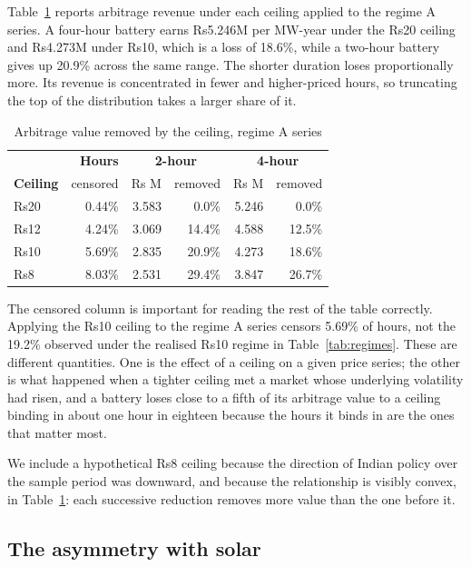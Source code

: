 \documentclass[conference,a4paper]{IEEEtran}
\begin{document}
Table~\ref{tab:removed} reports arbitrage revenue under each ceiling applied to
the regime A series. A four-hour battery earns Rs5.246M per MW-year under the
Rs20 ceiling and Rs4.273M under Rs10, which is a loss of 18.6\%, while a
two-hour battery gives up 20.9\% across the same range. The shorter duration
loses proportionally more. Its revenue is concentrated in fewer and
higher-priced hours, so truncating the top of the distribution takes a larger
share of it.

\begin{table}[htbp]
\caption{Arbitrage value removed by the ceiling, regime A series}
\label{tab:removed}
\centering
\begin{tabular}{lrrrrr}
\hline
& \textbf{Hours} & \multicolumn{2}{c}{\textbf{2-hour}} & \multicolumn{2}{c}{\textbf{4-hour}}\\
\textbf{Ceiling} & censored & Rs M & removed & Rs M & removed\\
\hline
Rs20 & 0.44\% & 3.583 & 0.0\% & 5.246 & 0.0\%\\
Rs12 & 4.24\% & 3.069 & 14.4\% & 4.588 & 12.5\%\\
Rs10 & 5.69\% & 2.835 & 20.9\% & 4.273 & 18.6\%\\
Rs8 & 8.03\% & 2.531 & 29.4\% & 3.847 & 26.7\%\\
\hline
\end{tabular}
\end{table}

The censored column is important for reading the rest of the table correctly.
Applying the Rs10 ceiling to the regime A series censors 5.69\% of hours, not the
19.2\% observed under the realised Rs10 regime in Table~\ref{tab:regimes}. These
are different quantities. One is the effect of a ceiling on a given price
series; the other is what happened when a tighter ceiling met a market whose
underlying volatility had risen, and a battery loses close to a fifth of its
arbitrage value to a ceiling binding in about one hour in eighteen because the
hours it binds in are the ones that matter most.

We include a hypothetical Rs8 ceiling because the direction of Indian policy over
the sample period was downward, and because the relationship is visibly convex,
in Table~\ref{tab:removed}: each successive reduction removes more value
than the one before it.


\subsection{The asymmetry with solar}
\end{document}
